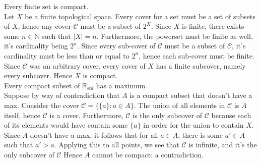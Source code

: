 \documentclass{article}
\newcommand{\N}{\mathbb{N}}
\newcommand{\R}{\mathbb{R}}
\begin{document}
 Every finite set is compact.\\

 Let $X$ be a finite topological space. Every cover for a set must be a set of subsets of $X$, hence any cover $\mathcal{C}$ must be a subset of $2^X$. Since $X$ is finite, there exists some $n\in \N$ such that $|X| = n$. Furthermore, the powerset must be finite as well, it's cardinality being $2^n$. Since every sub-cover of $\mathcal{C}$ must be a subset of $\mathcal{C}$, it's cardinality must be less than or equal to $2^n$, hence each sub-cover must be finite. Since $\mathcal{C}$ was an arbitrary cover, every cover of $X$ has a finite subcover, namely every subcover. Hence $X$ is compact.\\

 Every compact subset of $\R_{std}$ has a maximum.\\

 Suppose by way of contradiction that $A$ is a compact subset that doesn't have a max. Consider the cover $\mathcal{C} = \{\{a\}:a\in A\}$. The union of all elements in $\mathcal{C}$ is $A$ itself, hence $\mathcal{C}$ is a cover. Furthermore, $\mathcal{C}$ is the only subcover of $\mathcal{C}$ because each of its elements would have contain some $\{a\}$ in order for the union to contain $X$.\\

Since $A$ doesn't have a max, it follows that for all $a\in A$, there is some $a'\in A$ such that $a' > a$. Applying this to all points, we see that $\mathcal{C}$ is infinite, and it's the only subcover of $\mathcal{C}$ Hence $A$ cannot be compact: a contradiction.
\end{document}
